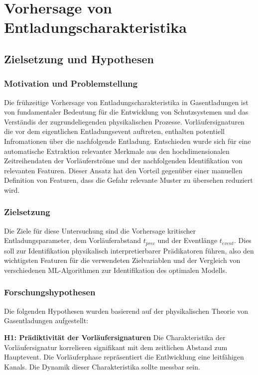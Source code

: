 \chapter{Vorhersage von Entladungscharakteristika}
\label{chap:prediction}

\section{Zielsetzung und Hypothesen}

\subsection{Motivation und Problemstellung}
Die frühzeitige Vorhersage von Entladungscharakteristika in Gasentladungen ist von fundamentaler Bedeutung für die Entwicklung von Schutzsystemen und das Verständis der zugrundeliegenden physikalischen Prozesse. Vorläufersignaturen die vor dem eigentlichen Entladungsevent auftreten, enthalten potentiell Infromationen über die nachfolgende Entladung. Entschieden wurde sich für eine automatische Extraktion relevanter Merkmale aus den hochdimensionalen Zeitreihendaten der Vorläuferströme und der nachfolgenden Identifikation von relevanten Featuren. Dieser Ansatz hat den Vorteil gegenüber einer manuellen Definition von Featuren, dass die Gefahr relevante Muster zu übersehen reduziert wird.
\subsection{Zielsetzung}
Die Ziele für diese Untersuchung sind die Vorhersage kritischer Entladungsparameter, dem Vorläuferabstand \(t_{prec}\) und der Eventlänge \(t_{event}\). Dies soll zur Identifikation physikalisch interpretierbarer Prädikatoren führen, also den wichtigsten Featuren für die verwendeten Zielvariablen und der Vergleich von verschiedenen ML-Algorithmen zur Identifikation des optimalen Modells.
\subsection{Forschungshypothesen}
Die folgenden Hypothesen wurden basierend auf der physikalischen Theorie von Gasentladungen aufgestellt:

\textbf{H1: Prädiktivität der Vorläufersignaturen}\newline
Die Charakteristika der Vorläufersignatur korrelieren signifikant mit dem zeitlichen Abstand zum Hauptevent.\newline
Die Vorläuferphase repräsentiert die Entlwicklung eine leitfähigen Kanals. Die Dynamik dieser Charakteristika sollte messbar sein.\newline

